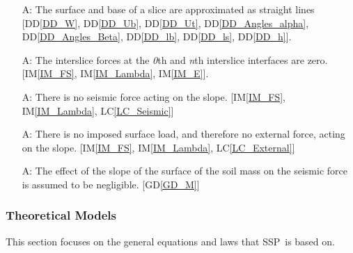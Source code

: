 \documentclass[12pt]{article}
\newcommand{\progname}{SSP}
\newcounter{assumpnum} %
\newcommand{\iref}[1]{IM\ref{#1}}
\newcommand{\ddref}[1]{DD\ref{#1}}
\newcommand{\dref}[1]{GD\ref{#1}}
\newcommand{\lcref}[1]{LC\ref{#1}}
\begin{document}
\begin{enumerate}[label=A\arabic*:,ref={\arabic*}]
\item [A\refstepcounter{assumpnum}\theassumpnum: \label{A_Straight}]
  The surface and base of a slice are approximated as straight lines 
  [\ddref{DD_W}, \ddref{DD_Ub}, \ddref{DD_Ut}, \ddref{DD_Angles_alpha}, 
  \ddref{DD_Angles_Beta}, \ddref{DD_lb}, \ddref{DD_ls}, \ddref{DD_h}].
  
\item [A\refstepcounter{assumpnum}\theassumpnum: \label{A_EdgeSlices}] The 
interslice forces at the \textit{0}th and \textit{n}th interslice interfaces 
are zero. [\iref{IM_FS}, \iref{IM_Lambda}, \iref{IM_E}].
  
\item [A\refstepcounter{assumpnum}\theassumpnum: \label{A_Seismic}] There is no 
seismic force acting on the slope. [\iref{IM_FS}, \iref{IM_Lambda}, 
\lcref{LC_Seismic}]
  
\item [A\refstepcounter{assumpnum}\theassumpnum: \label{A_External}] There is 
no imposed surface load, and therefore no external force, acting on the slope. 
[\iref{IM_FS}, \iref{IM_Lambda}, \lcref{LC_External}]

\item [A\refstepcounter{assumpnum}\theassumpnum: \label{A_SeismicSurfSlope}] 
The effect of the slope of the surface of the soil mass on the seismic force is 
assumed to be negligible. 
[\dref{GD_M}]

\end{enumerate}

\subsubsection{Theoretical Models} \label{sec_theoretical}

This section focuses on the general equations and laws that \progname\ is based
on.

~\newline
\end{document}
